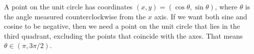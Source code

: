 A point on the unit circle has coordinates $(x,y)=(\cos\theta,\sin\theta)$,
where $\theta$ is the angle measured counterclockwise from the $x$ axis.
If we want both sine and cosine to be negative, then we need a point on
the unit circle that lies in the third quadrant, excluding the points
that coincide with the axes. That means $\theta\in(\pi,3\pi/2)$.
